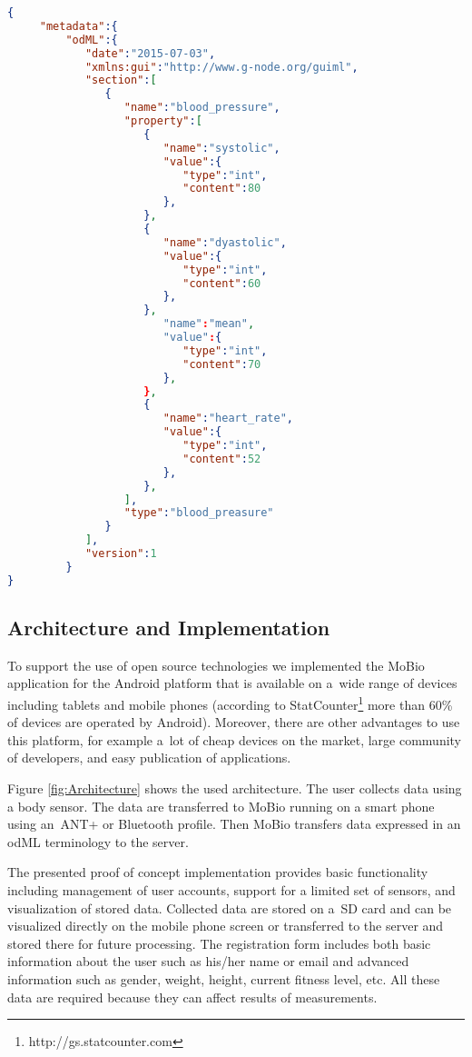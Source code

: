 \documentclass[a4paper,twoside]{article}
\begin{document}
\begin{lstlisting}[language=json,caption=Blood pressure example, label=odml_example]
{
     "metadata":{
         "odML":{
            "date":"2015-07-03",
            "xmlns:gui":"http://www.g-node.org/guiml",
            "section":[
               {
                  "name":"blood_pressure",
                  "property":[
                     {
                        "name":"systolic",
                        "value":{
                           "type":"int",
                           "content":80
                        },
                     },
                     {
                        "name":"dyastolic",
                        "value":{
                           "type":"int",
                           "content":60
                        },
                     },
                        "name":"mean",
                        "value":{
                           "type":"int",
                           "content":70
                        },
                     },
                     {
                        "name":"heart_rate",
                        "value":{
                           "type":"int",
                           "content":52
                        },
                     },
                  ],
                  "type":"blood_preasure"
               }
            ],
            "version":1
         }
}
\end{lstlisting}

\subsection{Architecture and Implementation}

To support the use of open source technologies we implemented the MoBio application for the Android platform that is available on a~wide range of devices including tablets and mobile phones  (according to StatCounter\footnote{http://gs.statcounter.com} more than 60\% of devices are operated by Android). Moreover, there are other advantages to use this platform, for example a~lot of cheap devices on the market, large community of developers, and easy publication of applications.

Figure \ref{fig:Architecture} shows the used architecture. The user collects data using a body sensor. The data are transferred to MoBio running on a smart phone using an~ANT+ or Bluetooth profile. Then MoBio transfers data expressed in an odML terminology to the server.

The presented proof of concept implementation provides basic functionality including management of user accounts, support for a limited set of sensors, and visualization of stored data. Collected data are stored on a~SD card and can be visualized directly on the mobile phone screen or transferred to the server and stored there for future processing. The registration form includes both basic information about the user such as his/her name or email and advanced information such as gender, weight, height, current fitness level, etc. All these data are required because they can affect results of measurements.
\end{document}
